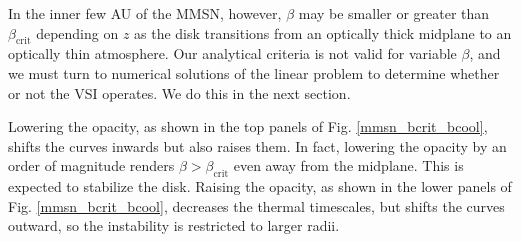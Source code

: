 In the inner few AU of the MMSN, however, $\beta$ 
may be smaller or greater than $\beta_\mathrm{crit}$ depending on
$z$ as the disk transitions from an optically thick midplane to an
optically thin atmosphere. 
Our analytical criteria is not valid for variable $\beta$, and we must
turn to numerical solutions of the linear problem to determine whether
or not the VSI operates. We do this in the next section.   
 
Lowering the opacity, as shown in the top panels of
Fig. \ref{mmsn_bcrit_bcool}, shifts the curves inwards but also raises
them. In fact, lowering the opacity by an order of magnitude renders  
$\beta > \beta_\mathrm{crit}$ even away from the midplane. This is 
expected to stabilize the disk. Raising the opacity, as shown in 
the lower panels of Fig. \ref{mmsn_bcrit_bcool}, decreases the thermal
timescales, but shifts the curves outward, so the instability is
restricted to larger radii.  


